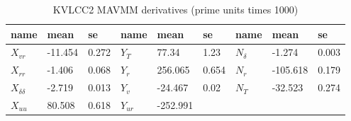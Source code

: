\begin{table}[h]
    \footnotesize
    \centering
        \caption{KVLCC2 MAVMM derivatives (prime units times 1000)}
    \label{\detokenize{06.20_results_kvlcc2:kvlcc2-derivatives}}
    \begin{tabular}{|T|T|T|T|T|T|T|T|T|}
\hline


name
&

mean
&

se
&

name
&

mean
&

se
&

name
&

mean
&

se
\\
\hline

\( X_{vr} \)
&

-11.454
&

0.272
&

\( Y_{T} \)
&

77.34
&

1.23
&

\( N_{\delta} \)
&

-1.274
&

0.003
\\


\( X_{rr} \)
&

-1.406
&

0.068
&

\( Y_{r} \)
&

256.065
&

0.654
&

\( N_{r} \)
&

-105.618
&

0.179
\\


\( X_{\delta\delta} \)
&

-2.719
&

0.013
&

\( Y_{v} \)
&

-24.467
&

0.02
&

\( N_{T} \)
&

-32.523
&

0.274
\\


\( X_{uu} \)
&

80.508
&

0.618
&

\( Y_{ur} \)
&

-252.991
&


\end{tabular}
\end{table}

